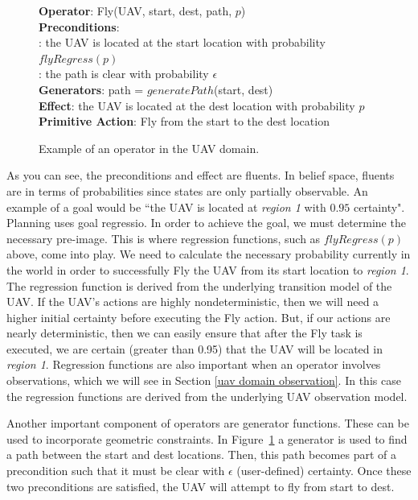 \documentclass[12pt]{article}
\begin{document}
\begin{figure}
\textbf{Operator}: Fly(UAV, start, dest, path, $p$)\\
\textbf{Preconditions}: \\
: the UAV is located at the start location with probability $flyRegress(p)$\\
: the path is clear with probability $\epsilon$\\
\textbf{Generators}: path = $generatePath$(start, dest)\\
\textbf{Effect}: the UAV is located at the dest location with probability $p$\\
\textbf{Primitive Action}: Fly from the start to the dest location
\label{example operator}
\caption{Example of an operator in the UAV domain.}
\end{figure}

As you can see, the preconditions and effect are fluents. In belief space, fluents are in terms of probabilities since states are only partially observable. An example of a goal would be ``the UAV is located at \textit{region 1} with $0.95$ certainty". Planning uses goal regressio. In order to achieve the goal, we must determine the necessary pre-image. This is where regression functions, such as $flyRegress(p)$ above, come into play. We need to calculate the necessary probability currently in the world in order to successfully Fly the UAV from its start location to \textit{region 1}. The regression function is derived from the underlying transition model of the UAV. If the UAV's actions are highly nondeterministic, then we will need a higher initial certainty before executing the Fly action. But, if our actions are nearly deterministic, then we can easily ensure that after the Fly task is executed, we are certain (greater than 0.95) that the UAV will be located in \textit{region 1}. Regression functions are also important when an operator involves observations, which we will see in Section \ref{uav domain observation}. In this case the regression functions are derived from the underlying UAV observation model.

Another important component of operators are generator functions. These can be used to incorporate geometric constraints. In Figure~\ref{example operator} a generator is used to find a path between the start and dest locations. Then, this path becomes part of a precondition such that it must be clear with $\epsilon$ (user-defined) certainty. Once these two preconditions are satisfied, the UAV will attempt to fly from start to dest.
\end{document}
